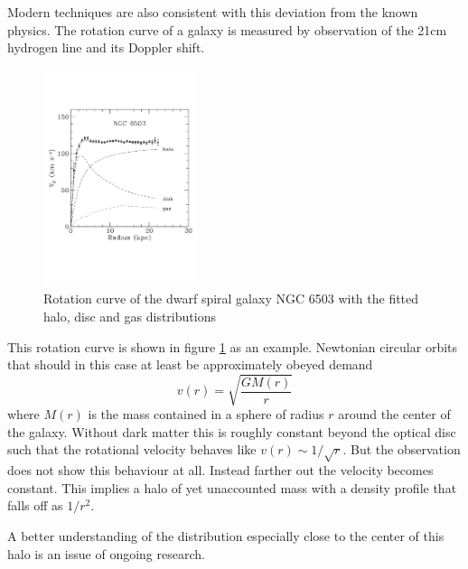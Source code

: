 Modern techniques are also consistent with this deviation from the known physics. The rotation curve of a galaxy is measured by observation of the 21cm hydrogen line and its Doppler shift. 
\begin{figure}[ht]
  \centering
    \includegraphics[width=0.4\textwidth]{imgs/Rotation}
    \caption{Rotation curve of the dwarf spiral galaxy NGC 6503 with the fitted halo, disc and gas distributions \cite{Begeman:1991iy}}
    \label{fg:RotationCurve}
\end{figure}
This rotation curve is shown in figure \ref{fg:RotationCurve} as an example. Newtonian circular orbits that should in this case at least be approximately obeyed demand 
\begin{equation}
v(r)=\sqrt{\frac{GM(r)}{r}}
\end{equation}
where $M(r)$ is the mass contained in a sphere of radius $r$ around the center of the galaxy. Without dark matter this is roughly constant beyond the optical disc such that the rotational velocity behaves like $v(r)\sim 1/\sqrt{r}$.
But the observation does not show this behaviour at all. Instead farther out the velocity becomes constant. This implies a halo of yet unaccounted mass with a density profile that falls off as $1/r^2$.

A better understanding of the distribution especially close to the center of this halo is an issue of ongoing research. \cite{Bertone:2004pz}

